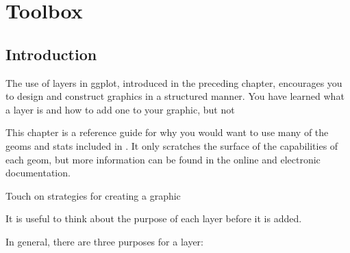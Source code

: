 

% 


\chapter{Toolbox}
\label{cha:toolbox}

\section{Introduction}\label{sec:introduction}

The use of layers in ggplot, introduced in the preceding chapter, encourages you to design and construct graphics in a structured manner.  You have learned what a layer is and how to add one to your graphic, but not 

This chapter is a reference guide for why you would want to use many of the geoms and stats included in \ggplot.  It only scratches the surface of the capabilities of each geom, but more information can be found in the online and electronic documentation.

Touch on strategies for creating a graphic

It is useful to think about the purpose of each layer before it is added.  

In general, there are three purposes for a layer:

